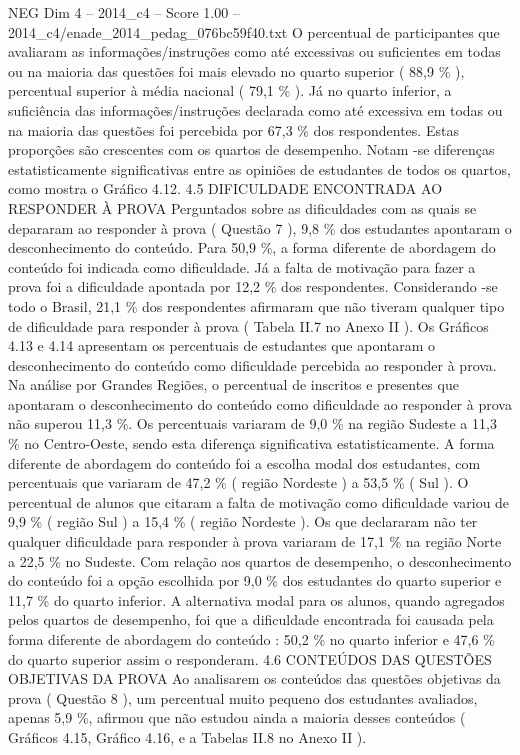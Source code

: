 \begin{textsample}{NEG Dim 4 – 2014\_c4 – Score 1.00 – 2014\_c4/enade\_2014\_pedag\_076bc59f40.txt}
O percentual de participantes que avaliaram as informações/instruções como até excessivas ou suficientes em todas ou na maioria das questões foi mais elevado no quarto superior ( 88,9 \% ), percentual superior à média nacional ( 79,1 \% ).
Já no quarto inferior, a suficiência das informações/instruções declarada como até excessiva em todas ou na maioria das questões foi percebida por 67,3 \% dos respondentes.
Estas proporções são crescentes com os quartos de desempenho.
Notam -se diferenças estatisticamente significativas entre as opiniões de estudantes de todos os quartos, como mostra o Gráfico 4.12. 4.5 DIFICULDADE ENCONTRADA AO RESPONDER À PROVA Perguntados sobre as dificuldades com as quais se depararam ao responder à prova ( Questão 7 ), 9,8 \% dos estudantes apontaram o desconhecimento do conteúdo.
Para 50,9 \%, a forma diferente de abordagem do conteúdo foi indicada como dificuldade.
Já a falta de motivação para fazer a prova foi a dificuldade apontada por 12,2 \% dos respondentes.
Considerando -se todo o Brasil, 21,1 \% dos respondentes afirmaram que não tiveram qualquer tipo de dificuldade para responder à prova ( Tabela II.7 no Anexo II ).
Os Gráficos 4.13 e 4.14 apresentam os percentuais de estudantes que apontaram o desconhecimento do conteúdo como dificuldade percebida ao responder à prova.
Na análise por Grandes Regiões, o percentual de inscritos e presentes que apontaram o desconhecimento do conteúdo como dificuldade ao responder à prova não superou 11,3 \%.
Os percentuais variaram de 9,0 \% na região Sudeste a 11,3 \% no Centro-Oeste, sendo esta diferença significativa estatisticamente.
A forma diferente de abordagem do conteúdo foi a escolha modal dos estudantes, com percentuais que variaram de 47,2 \% ( região Nordeste ) a 53,5 \% ( Sul ).
O percentual de alunos que citaram a falta de motivação como dificuldade variou de 9,9 \% ( região Sul ) a 15,4 \% ( região Nordeste ).
Os que declararam não ter qualquer dificuldade para responder à prova variaram de 17,1 \% na região Norte a 22,5 \% no Sudeste.
Com relação aos quartos de desempenho, o desconhecimento do conteúdo foi a opção escolhida por 9,0 \% dos estudantes do quarto superior e 11,7 \% do quarto inferior.
A alternativa modal para os alunos, quando agregados pelos quartos de desempenho, foi que a dificuldade encontrada foi causada pela forma diferente de abordagem do conteúdo : 50,2 \% no quarto inferior e 47,6 \% do quarto superior assim o responderam. 4.6 CONTEÚDOS DAS QUESTÕES OBJETIVAS DA PROVA Ao analisarem os conteúdos das questões objetivas da prova ( Questão 8 ), um percentual muito pequeno dos estudantes avaliados, apenas 5,9 \%, afirmou que não estudou ainda a maioria desses conteúdos ( Gráficos 4.15, Gráfico 4.16, e a Tabelas II.8 no Anexo II ).

\end{textsample}
